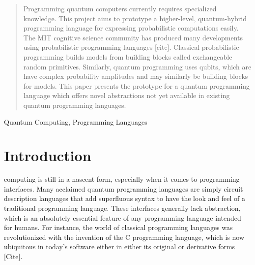 \documentclass[journal]{IEEEtran}
\begin{document}


\maketitle

\begin{abstract}
    Programming quantum computers currently requires specialized knowledge. 
    This project aims to prototype a higher-level, quantum-hybrid programming language for expressing probabilistic computations easily.
    The MIT cognitive science community has produced many developments using probabilistic programming languages [cite]. 
    Classical probabilistic programming builds models from building blocks called exchangeable random primitives. 
    Similarly, quantum programming uses qubits, which are have complex probability amplitudes and may similarly be building blocks for models.
    This paper presents the prototype for a quantum programming language which offers novel abstractions not yet available in existing quantum programming languages.
\end{abstract}

\begin{IEEEkeywords}
    Quantum Computing, Programming Languages
\end{IEEEkeywords}

\IEEEpeerreviewmaketitle

\section{Introduction}
 computing is still in a nascent form, especially when it comes to programming interfaces. 
Many acclaimed quantum programming languages are simply circuit description languages that add superfluous syntax to have the look and feel of a traditional programming language.
These interfaces generally lack abstraction, which is an absolutely essential feature of any programming language intended for humans.
For instance, the world of classical programming languages was revolutionized with the invention of the C programming language, which is now ubiquitous in today's software either in either its original or derivative forms [Cite]. 
\end{document}
